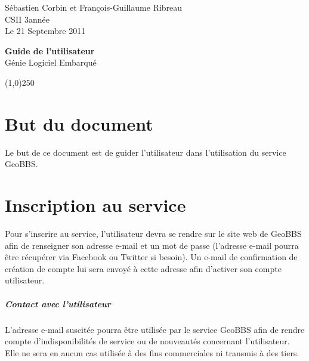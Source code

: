 \documentclass[a4paper,12pt]{report}
\begin{document}
  \begin{onehalfspace}

    \begin{titlepage}
      \begin{center}
        Sébastien Corbin et François-Guillaume Ribreau\\
        CSII 3\ieme année\\
        Le 21 Septembre 2011\\
      \end{center}
      \hrulefill
      \vspace{7cm}
      \begin{center}
        \LARGE \textbf{Guide de l'utilisateur}\\
        \vspace{3cm}
        \normalsize Génie Logiciel Embarqué
      \end{center}

      \vspace{9,5cm}

      \begin{center}
      \line(1,0){250}
      \end{center}

      \begin{center}
      \tiny{\currfilename}
      \end{center}
  
   \setcounter{page}{0}
    \end{titlepage}
    \clearpage

\chapter{But du document}
Le but de ce document est de guider l'utilisateur dans l'utilisation du service GeoBBS.

\chapter{Inscription au service}

Pour s'inscrire au service, l'utilisateur devra se rendre sur le site web de GeoBBS afin de renseigner son adresse e-mail et un mot de passe (l'adresse e-mail pourra être récupérer via Facebook ou Twitter si besoin).
Un e-mail de confirmation de création de compte lui sera envoyé à cette adresse afin d'activer son compte utilisateur.

\paragraph*{Contact avec l'utilisateur}
L'adresse e-mail suscitée pourra être utilisée par le service GeoBBS afin de rendre compte d'indisponibilités de service ou de nouveautés concernant l'utilisateur. Elle ne sera en aucun cas utilisée à des fins commerciales ni transmis à des tiers.


\end{onehalfspace}
\end{document}
